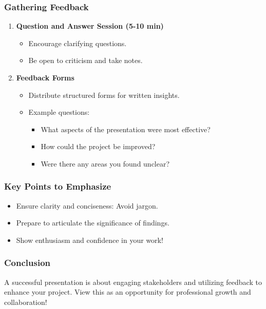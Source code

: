 \documentclass{beamer}
\begin{document}
\begin{frame}[fragile]
    \frametitle{Gathering Feedback}
    
    \begin{enumerate}
        \item \textbf{Question and Answer Session (5-10 min)}
            \begin{itemize}
                \item Encourage clarifying questions.
                \item Be open to criticism and take notes.
            \end{itemize}
        
        \item \textbf{Feedback Forms}
            \begin{itemize}
                \item Distribute structured forms for written insights.
                \item Example questions:
                    \begin{itemize}
                        \item What aspects of the presentation were most effective?
                        \item How could the project be improved?
                        \item Were there any areas you found unclear?
                    \end{itemize}
            \end{itemize}
    \end{enumerate}
\end{frame}

\begin{frame}[fragile]
    \frametitle{Key Points to Emphasize}
    
    \begin{itemize}
        \item Ensure clarity and conciseness: Avoid jargon.
        \item Prepare to articulate the significance of findings.
        \item Show enthusiasm and confidence in your work!
    \end{itemize}
\end{frame}

\begin{frame}[fragile]
    \frametitle{Conclusion}
    
    A successful presentation is about engaging stakeholders and utilizing feedback to enhance your project. View this as an opportunity for professional growth and collaboration!
\end{frame}
\end{document}
